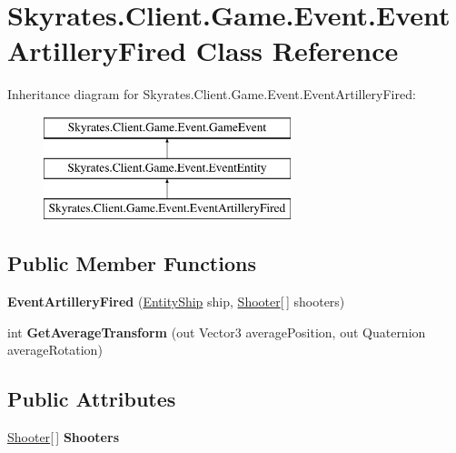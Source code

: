 \hypertarget{class_skyrates_1_1_client_1_1_game_1_1_event_1_1_event_artillery_fired}{\section{Skyrates.\-Client.\-Game.\-Event.\-Event\-Artillery\-Fired Class Reference}
\label{class_skyrates_1_1_client_1_1_game_1_1_event_1_1_event_artillery_fired}
}
Inheritance diagram for Skyrates.\-Client.\-Game.\-Event.\-Event\-Artillery\-Fired\-:\begin{figure}[H]
\begin{center}
\leavevmode
\includegraphics[height=3.000000cm]{class_skyrates_1_1_client_1_1_game_1_1_event_1_1_event_artillery_fired}
\end{center}
\end{figure}
\subsection*{Public Member Functions}
\begin{DoxyCompactItemize}
\item 
\hypertarget{class_skyrates_1_1_client_1_1_game_1_1_event_1_1_event_artillery_fired_a24dc075d0ff12e05a7b9d81cf3262758}{{\bfseries Event\-Artillery\-Fired} (\hyperlink{class_skyrates_1_1_common_1_1_entity_1_1_entity_ship}{Entity\-Ship} ship, \hyperlink{class_shooter}{Shooter}\mbox{[}$\,$\mbox{]} shooters)}\label{class_skyrates_1_1_client_1_1_game_1_1_event_1_1_event_artillery_fired_a24dc075d0ff12e05a7b9d81cf3262758}

\item 
\hypertarget{class_skyrates_1_1_client_1_1_game_1_1_event_1_1_event_artillery_fired_a58bb7b842dad16ff93c6702295648238}{int {\bfseries Get\-Average\-Transform} (out Vector3 average\-Position, out Quaternion average\-Rotation)}\label{class_skyrates_1_1_client_1_1_game_1_1_event_1_1_event_artillery_fired_a58bb7b842dad16ff93c6702295648238}

\end{DoxyCompactItemize}
\subsection*{Public Attributes}
\begin{DoxyCompactItemize}
\item 
\hypertarget{class_skyrates_1_1_client_1_1_game_1_1_event_1_1_event_artillery_fired_a9f5e4a291e93d6611f840341b84a78e6}{\hyperlink{class_shooter}{Shooter}\mbox{[}$\,$\mbox{]} {\bfseries Shooters}}\label{class_skyrates_1_1_client_1_1_game_1_1_event_1_1_event_artillery_fired_a9f5e4a291e93d6611f840341b84a78e6}

\end{DoxyCompactItemize}


